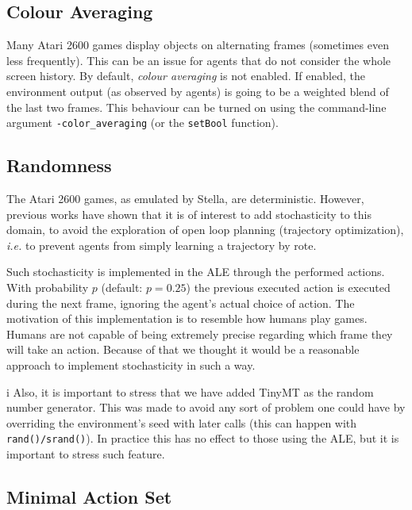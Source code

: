\documentclass[12pt]{article}
\begin{document}
\subsection{Colour Averaging}

Many Atari 2600 games display objects on alternating frames (sometimes even less frequently).
This can be an issue for agents that do not consider the whole screen history. By default, 
\emph{colour averaging} is not enabled. If enabled, the environment output (as observed by agents)
is going to be a weighted blend of the last two frames. This behaviour can be turned on using the
command-line argument \verb+-color_averaging+ (or the \verb+setBool+ function).

\subsection{Randomness}

The Atari 2600 games, as emulated by Stella, are deterministic. However, previous works have shown 
that it is of interest to add stochasticity to this domain, to avoid the exploration of open loop 
planning (trajectory optimization), \emph{i.e.} to prevent agents from simply learning a trajectory by
rote. 

Such stochasticity is implemented in the ALE through the performed actions. With probability $p$
(default: $p = 0.25$) the previous executed action is executed during the next frame, ignoring the 
agent's actual choice of action. The motivation of this implementation is to 
resemble how humans play games. Humans are not capable of being extremely precise regarding which 
frame they will take an action. Because of that we thought it would be a reasonable approach to 
implement stochasticity in such a way.

i
Also,  it is important to stress that we have added TinyMT as the random number generator. This was 
made to avoid any sort of problem one could have by overriding the environment's seed with later 
calls (this can happen with \verb+rand()/srand()+). In practice this has no effect to those using
the ALE, but it is important to stress such feature.

\subsection{Minimal Action Set}
\end{document}
